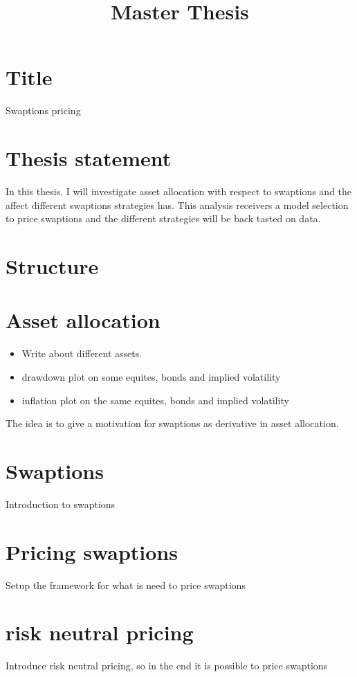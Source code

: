 \documentclass{article}
\title{Master Thesis}
\author{}
\begin{document}
\maketitle
\tableofcontents
\newpage

\section*{Title}
Swaptions pricing 

\section*{Thesis statement}
In this thesis, I will investigate asset allocation with respect to swaptions and the affect different swaptions strategies has.
This analysis receivers a model selection to price swaptions and the different strategies will be back tasted on data.

\section*{Structure}

\section{Asset allocation}
\begin{itemize}
  \item Write about different assets.
  \item drawdown plot on some equites, bonds and implied volatility
  \item inflation plot on the same equites, bonds and implied volatility
\end{itemize}  
The idea is to give a motivation for swaptions as derivative in asset allocation. 
 

\section{Swaptions}
Introduction to swaptions

\section{Pricing swaptions}
Setup the framework for what is need to price swaptions

\section{risk neutral pricing}
Introduce risk neutral pricing, so in the end it is possible to price swaptions
\end{document}
